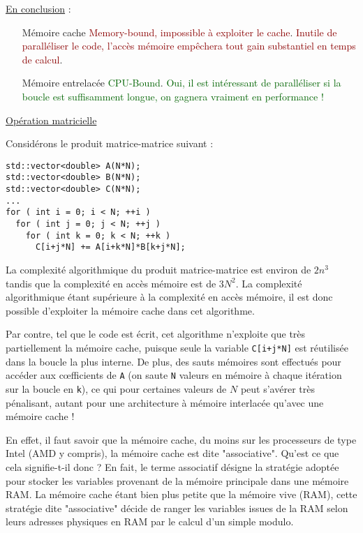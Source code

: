\documentclass[fleqn,11pt]{article}
\begin{document}
\underline{En conclusion} :
\begin{itemize}
\item [Mémoire cache] \textcolor{darkred}{Memory-bound, impossible à exploiter le cache}. \textcolor{darkred}{Inutile de paralléliser le code, l'accès mémoire empêchera tout gain substantiel en temps de calcul}.
\item [Mémoire entrelacée] \textcolor{darkgreen}{CPU-Bound}. \textcolor{darkgreen}{Oui, il est intéressant de paralléliser si la boucle est suffisamment longue, on gagnera vraiment en performance !}
\end{itemize}

\underline{Opération matricielle}

Considérons le produit matrice-matrice suivant :

\begin{lstlisting}
std::vector<double> A(N*N);
std::vector<double> B(N*N);
std::vector<double> C(N*N);
...
for ( int i = 0; i < N; ++i )
  for ( int j = 0; j < N; ++j )
    for ( int k = 0; k < N; ++k )
      C[i+j*N] += A[i+k*N]*B[k+j*N];
\end{lstlisting}

La complexité algorithmique du produit matrice-matrice est environ de $2n^{3}$ tandis que la complexité en accès
mémoire est de $3N^{2}$. La complexité algorithmique étant supérieure à la complexité en accès mémoire, il est donc possible d'exploiter la mémoire cache dans cet algorithme.

Par contre, tel que le code est écrit, cet algorithme n'exploite que très partiellement la mémoire cache,
puisque seule la variable \texttt{C[i+j*N]} est réutilisée dans la boucle la plus interne. De plus, des sauts
mémoires sont effectués pour accéder aux c{\oe}fficients de \texttt{A} (on saute \texttt{N} valeurs en mémoire à chaque itération sur la boucle en \texttt{k}), ce qui pour certaines valeurs de $N$ peut s'avérer très pénalisant, autant pour une architecture à mémoire interlacée qu'avec une mémoire cache !

En effet, il faut savoir que la mémoire cache, du moins sur les processeurs de type Intel (AMD y compris),
la mémoire cache est dite "associative". Qu'est ce que cela signifie-t-il donc ? En fait, le terme associatif
désigne la stratégie adoptée pour stocker les variables provenant de la mémoire principale dans une mémoire RAM. La mémoire cache étant bien plus petite que la mémoire vive (RAM), cette stratégie dite "associative"
décide de ranger les variables issues de la RAM selon leurs adresses physiques en RAM par le calcul d'un simple modulo.
\end{document}
